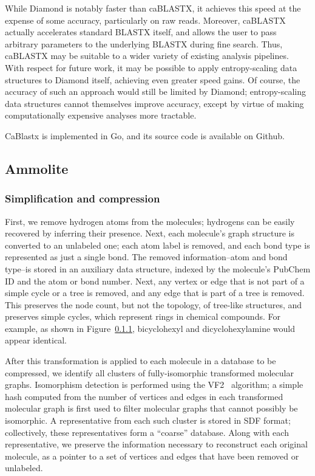 \documentclass[review,preprint,12pt]{elsarticle}
\renewcommand{\cite}{\citep} %
\theoremstyle{definition}
\theoremstyle{remark}
\begin{document}
While Diamond is notably faster than caBLASTX, it achieves this speed at the
expense of some accuracy, particularly on raw reads.
Moreover, caBLASTX actually accelerates standard BLASTX itself, and allows the
user to pass arbitrary parameters to the underlying BLASTX during fine search.
Thus, caBLASTX may be suitable to a wider variety of existing analysis 
pipelines.
With respect for future work, it may be possible to apply entropy-scaling data
structures to Diamond itself, achieving even greater speed gains.
Of course, the accuracy of such an approach would still be limited by Diamond; 
entropy-scaling data structures cannot themselves improve accuracy,
except by virtue of making computationally expensive analyses more tractable.

CaBlastx is implemented in Go, and its source code is available on Github.

\subsection{Ammolite}

\subsubsection{Simplification and compression}

First, we remove hydrogen atoms from the molecules; hydrogens can be easily recovered by inferring their 
presence.
Next, each molecule's graph structure is converted to an unlabeled one; each atom label is removed, and each
bond type is represented as just a single bond.
The removed information--atom and bond type--is stored in an auxiliary data structure, indexed by the molecule's
PubChem ID and the atom or bond number.
Next, any vertex or edge that is not part of a simple cycle or a tree is removed, and any edge that is part
of a tree is removed.
This preserves the node count, but not the topology, of tree-like structures, and preserves simple cycles,
which represent rings in chemical compounds.
For example, as shown in Figure~\ref{}, bicyclohexyl and dicyclohexylamine would appear identical.

After this transformation is applied to each molecule in a database to be compressed, we identify all clusters
of fully-isomorphic transformed molecular graphs.
Isomorphism detection is performed using the VF2~\cite{cordella2001improved} 
algorithm; a simple hash computed from the
number of vertices and edges in each transformed molecular graph is first used 
to filter molecular graphs that cannot possibly be isomorphic.
A representative from each such cluster is stored in SDF format; collectively, these representatives form a 
``coarse'' database.
Along with each representative, we preserve the information necessary to reconstruct each original molecule,
as a pointer to a set of vertices and edges that have been removed or unlabeled.
\end{document}
